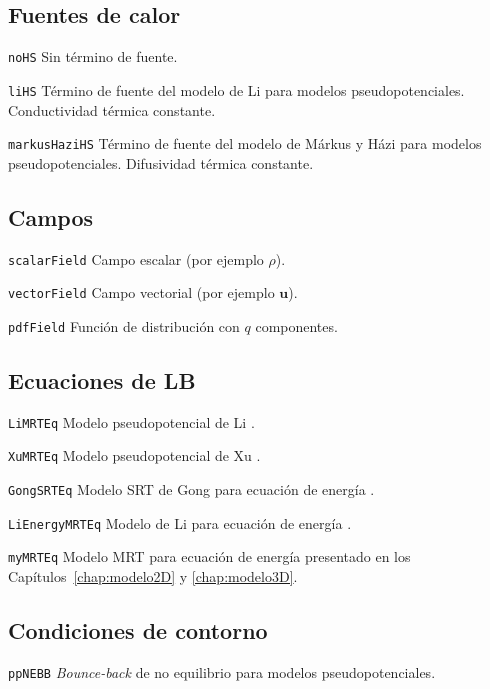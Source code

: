 \subsection{Fuentes de calor}

\texttt{noHS}\: Sin t\'ermino de fuente.
\medskip

\texttt{liHS}\: T\'ermino de fuente del modelo de Li para modelos pseudopotenciales. Conductividad t\'ermica constante.
\medskip

\texttt{markusHaziHS}\: T\'ermino de fuente del modelo de M\'arkus y H\'azi para modelos pseudopotenciales. Difusividad t\'ermica constante.



\subsection{Campos}

\texttt{scalarField}\: Campo escalar (por ejemplo $\rho$).
\medskip

\texttt{vectorField}\: Campo vectorial (por ejemplo $\bm{u}$).
\medskip

\texttt{pdfField}\: Funci\'on de distribuci\'on con $q$ componentes.



\subsection{Ecuaciones de LB}

\texttt{LiMRTEq}\: Modelo pseudopotencial de Li \cite{li_lattice_2013}.
\medskip

\texttt{XuMRTEq}\: Modelo pseudopotencial de Xu \cite{xu_three-dimensional_2015}.
\medskip

\texttt{GongSRTEq}\: Modelo SRT de Gong para ecuaci\'on de energ\'ia \cite{gong_lattice_2012}.
\medskip

\texttt{LiEnergyMRTEq}\: Modelo de Li para ecuaci\'on de energ\'ia \cite{li_improved_2017}.
\medskip

\texttt{myMRTEq}\: Modelo MRT para ecuaci\'on de energ\'ia presentado en los Cap\'itulos~\ref{chap:modelo2D} y \ref{chap:modelo3D}.



\subsection{Condiciones de contorno}

\texttt{ppNEBB}\: \emph{Bounce-back} de no equilibrio para modelos pseudopotenciales.
\medskip

